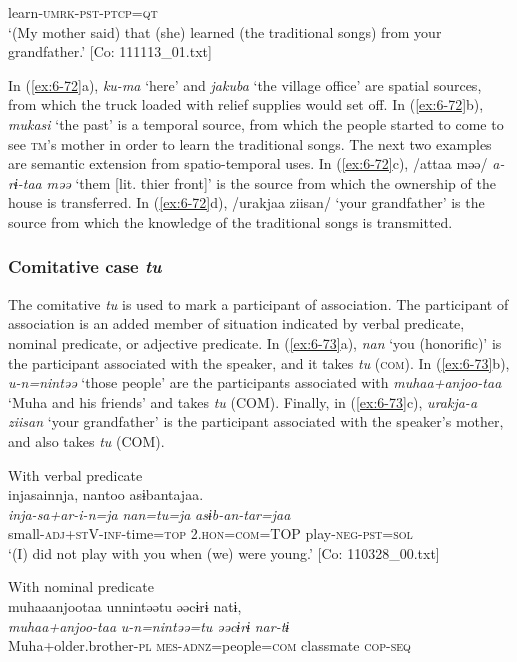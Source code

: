 \begin{table}
      learn-\textsc{umrk}-\textsc{pst}-\textsc{ptcp}=\textsc{qt}\\
\glt ‘(My mother said) that (she) learned (the traditional songs) from your grandfather.’ [Co: 111113\_01.txt]
\z

In (\ref{ex:6-72}a), \textit{ku-ma} ‘here’ and \textit{jakuba} ‘the village office’ are spatial sources, from which the truck loaded with relief supplies would set off. In (\ref{ex:6-72}b), \textit{mukasi} ‘the past’ is a temporal source, from which the people started to come to see \textsc{tm}’s mother in order to learn the traditional songs. The next two examples are semantic extension from spatio-temporal uses. In (\ref{ex:6-72}c), /attaa məə/ \textit{a-rɨ-taa} \textit{məə} ‘them [lit. thier front]’ is the source from which the ownership of the house is transferred. In (\ref{ex:6-72}d), /urakjaa ziisan/ ‘your grandfather’ is the source from which the knowledge of the traditional songs is transmitted.

\subsubsection{ Comitative case \textit{tu}}

The comitative \textit{tu} is used to mark a participant of association. The participant of association is an added member of situation indicated by verbal predicate, nominal predicate, or adjective predicate. In (\ref{ex:6-73}a), \textit{nan} ‘you (honorific)’ is the participant associated with the speaker, and it takes \textit{tu} (\textsc{com}). In (\ref{ex:6-73}b), \textit{u-n=nintəə} ‘those people’ are the participants associated with \textit{muhaa+anjoo-taa} ‘Muha and his friends’ and takes \textit{tu} (COM). Finally, in (\ref{ex:6-73}c), \textit{urakja-a} \textit{ziisan} ‘your grandfather’ is the participant associated with the speaker’s mother, and also takes \textit{tu} (COM).

\ea\label{ex:6-73}
\ea With verbal predicate\\
{\TM}
\glll  injasainnja,  nantoo  asɨbantajaa.\\
\textit{inja-sa+ar-i-n=ja}  \textit{nan=tu=ja}  \textit{asɨb-an-tar=jaa}\\
small-\textsc{adj}+\textsc{st}V-\textsc{inf}-time=\textsc{top}  2.\textsc{hon}=\textsc{com}=TOP  play-\textsc{neg}-\textsc{pst}=\textsc{sol}\\
\glt ‘(I) did not play with you when (we) were young.’ [Co: 110328\_00.txt]
\z

\ex With nominal predicate\\
{\TM}
\glll  muhaaanjootaa  unnintəətu  əəcɨrɨ  natɨ,\\
\textit{muhaa+anjoo-taa}  \textit{u-n=nintəə=tu}  \textit{əəcɨrɨ}  \textit{nar-tɨ}\\
Muha+older.brother-\textsc{pl}  \textsc{mes}-\textsc{adnz}=people=\textsc{com}  classmate  \textsc{cop}-\textsc{seq}


\end{table}
